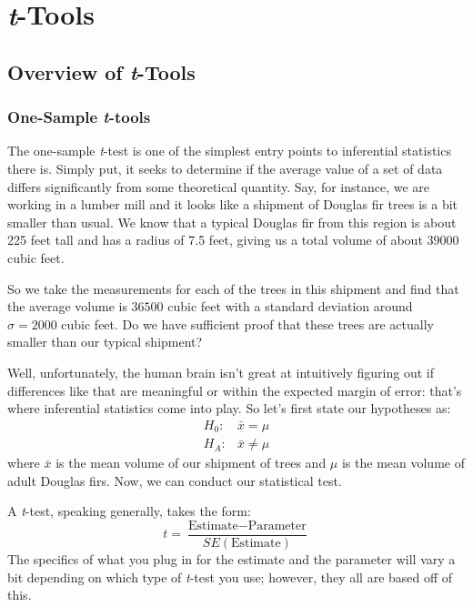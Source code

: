 
\chapter{\textit{t}-Tools}

\section{Overview of \textit{t}-Tools}

\subsection{One-Sample \textit{t}-tools}

The one-sample \textit{t}-test is one of the simplest entry points to inferential statistics there is. Simply put, it seeks to determine if the average value of a set of data differs significantly from some theoretical quantity. Say, for instance, we are working in a lumber mill and it looks like a shipment of Douglas fir trees is a bit smaller than usual. We know that a typical Douglas fir from this region is about 225 feet tall and has a radius of 7.5 feet, giving us a total volume of about $39000$ cubic feet.

So we take the measurements for each of the trees in this shipment and find that the average volume is $36500$ cubic feet with a standard deviation around $\sigma = 2000$ cubic feet. Do we have sufficient proof that these trees are actually smaller than our typical shipment?

Well, unfortunately, the human brain isn't great at intuitively figuring out if differences like that are meaningful or within the expected margin of error: that's where inferential statistics come into play. So let's first state our hypotheses as:
\begin{eqnarray*}
H_0:& \bar{x} = \mu\\
H_A:& \bar{x} \neq \mu
\end{eqnarray*}
where $\bar{x}$ is the mean volume of our shipment of trees and $\mu$ is the mean volume of adult Douglas firs. Now, we can conduct our statistical test.

A \textit{t}-test, speaking generally, takes the form:
\begin{equation}
t = \frac{\text{Estimate}-\text{Parameter}}{SE(\text{Estimate})}
\end{equation}
The specifics of what you plug in for the estimate and the parameter will vary a bit depending on which type of \textit{t}-test you use; however, they all are based off of this.

